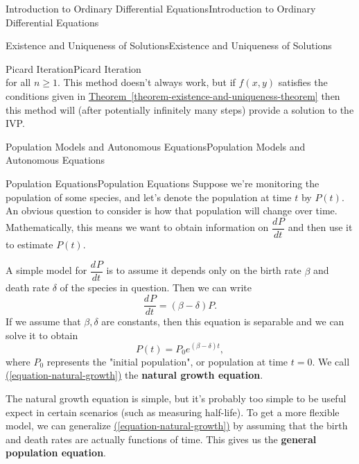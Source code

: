 \documentclass[10pt,]{book}
\newcommand{\terminology}[1]{\textbf{#1}}
\numberwithin{equation}{section}
\newcommand{\dv}[3][]{\dfrac{d^{#1} #2}{d #3^{#1}}}
\begin{document}
\begin{chapterptx}{Introduction to Ordinary Differential Equations}{}{Introduction to Ordinary Differential Equations}{}{}
\begin{sectionptx}{Existence and Uniqueness of Solutions}{}{Existence and Uniqueness of Solutions}{}{}
\begin{subsectionptx}{Picard Iteration}{}{Picard Iteration}{}{}
\begin{equation*}
\end{equation*}
for all \(n\geq1\). This method doesn't always work, but if \(f(x,y)\) satisfies the conditions given in \hyperref[theorem-existence-and-uniqueness-theorem]{Theorem~\ref{theorem-existence-and-uniqueness-theorem}} then this method will (after potentially infinitely many steps) provide a solution to the IVP.%
\end{subsectionptx}
\end{sectionptx}
%
%
\typeout{************************************************}
\typeout{************************************************}
%
\begin{sectionptx}{Population Models and Autonomous Equations}{}{Population Models and Autonomous Equations}{}{}\label{section-population-models-and-autonomous-equations}
%
%
\typeout{************************************************}
\typeout{************************************************}
%
\begin{subsectionptx}{Population Equations}{}{Population Equations}{}{}\label{subsection-population-equations}
\hypertarget{p-104}{}%
Suppose we're monitoring the population of some species, and let's denote the population at time \(t\) by \(P(t)\). An obvious question to consider is how that population will change over time. Mathematically, this means we want to obtain information on \(\dv{P}{t}\) and then use it to estimate \(P(t)\).%
\par
\hypertarget{p-105}{}%
A simple model for \(\dv{P}{t}\) is to assume it depends only on the birth rate \(\beta\) and death rate \(\delta\) of the species in question. Then we can write%
\begin{equation}
\dv{P}{t} = (\beta - \delta)P.\label{equation-natural-growth}
\end{equation}
If we assume that \(\beta,\delta\) are constants, then this equation is separable and we can solve it to obtain%
\begin{equation*}
P(t) = P_{0}e^{(\beta - \delta)t},
\end{equation*}
where \(P_{0}\) represents the "initial population", or population at time \(t = 0\). We call \hyperref[equation-natural-growth]{(\ref{equation-natural-growth})} the \terminology{natural growth equation}.%
\par
\hypertarget{p-106}{}%
The natural growth equation is simple, but it's probably too simple to be useful expect in certain scenarios (such as measuring half-life). To get a more flexible model, we can generalize \hyperref[equation-natural-growth]{(\ref{equation-natural-growth})} by assuming that the birth and death rates are actually functions of time. This gives us the \terminology{general population equation}.%

\end{subsectionptx}
\end{sectionptx}
\end{chapterptx}
\end{document}
